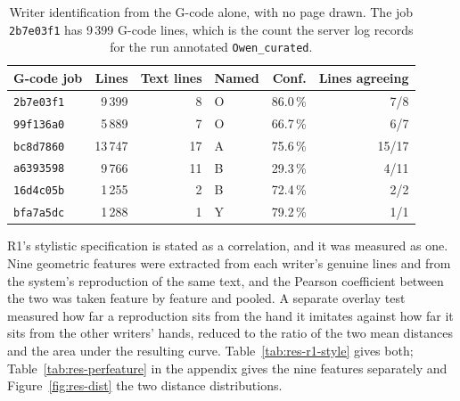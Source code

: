 \begin{table}[h]
\centering
\fontsize{10}{12}\selectfont
\begin{tabular}{|l|r|r|l|r|r|}
\hline
\textbf{G-code job} & \textbf{Lines} & \textbf{Text lines} & \textbf{Named} & \textbf{Conf.} & \textbf{Lines agreeing} \\
\hline
\texttt{2b7e03f1} & 9\,399  &  8 & O & 86.0\,\% & 7/8 \\
\texttt{99f136a0} & 5\,889  &  7 & O & 66.7\,\% & 6/7 \\
\texttt{bc8d7860} & 13\,747 & 17 & A & 75.6\,\% & 15/17 \\
\texttt{a6393598} & 9\,766  & 11 & B & 29.3\,\% & 4/11 \\
\texttt{16d4c05b} & 1\,255  &  2 & B & 72.4\,\% & 2/2 \\
\texttt{bfa7a5dc} & 1\,288  &  1 & Y & 79.2\,\% & 1/1 \\
\hline
\end{tabular}
\caption{Writer identification from the G-code alone, with no page drawn. The
job \texttt{2b7e03f1} has 9\,399 G-code lines, which is the count the server log
records for the run annotated \texttt{Owen\_curated}.}
\label{tab:res-gcode}
\end{table}

        R1's stylistic specification is stated as a correlation, and it was
        measured as one. Nine geometric features were extracted from each
        writer's genuine lines and from the system's reproduction of the same
        text, and the Pearson coefficient between the two was taken feature by
        feature and pooled. A separate overlay test measured how far a
        reproduction sits from the hand it imitates against how far it sits from
        the other writers' hands, reduced to the ratio of the two mean distances
        and the area under the resulting curve.
        Table~\ref{tab:res-r1-style} gives both;
        Table~\ref{tab:res-perfeature} in the appendix gives the nine features
        separately and Figure~\ref{fig:res-dist} the two distance distributions.

